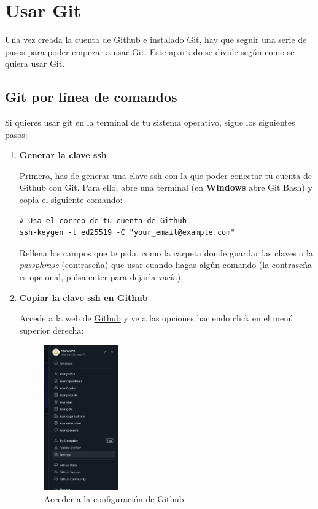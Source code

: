 \documentclass[]{article}
\begin{document}
\newpage
\section{Usar Git}
Una vez creada la cuenta de Github e instalado Git, hay que seguir una serie de pasos para poder empezar a usar Git. Este apartado se divide según como se quiera usar Git.

\subsection{Git por línea de comandos}
Si quieres usar git en la terminal de tu sistema operativo, sigue los siguientes pasos:

\begin{enumerate}
    \item \textbf{Generar la clave ssh}
    
    Primero, has de generar una clave ssh con la que poder conectar tu cuenta de Github con Git. Para ello, abre una terminal (en \textbf{Windows} abre Git Bash) y copia el siguiente comando:

    \begin{lstlisting}
# Usa el correo de tu cuenta de Github
ssh-keygen -t ed25519 -C "your_email@example.com"
    \end{lstlisting}

    Rellena los campos que te pida, como la carpeta donde guardar las claves o la \textit{passphrase} (contraseña) que usar cuando hagas algún comando (la contraseña es opcional, pulsa enter para dejarla vacía).
    
    \item \textbf{Copiar la clave ssh en Github}
    
    Accede a la web de \textcolor{blue}{\href{https://github.com/}{Github}} y ve a las opciones haciendo click en el menú superior derecha:

    \begin{figure}[H]
        \centering
        \includegraphics[width=0.3\textwidth]{./static/github_1.png}
        \caption{Acceder a la configuración de Github}
    \end{figure}


\end{enumerate}
\end{document}
